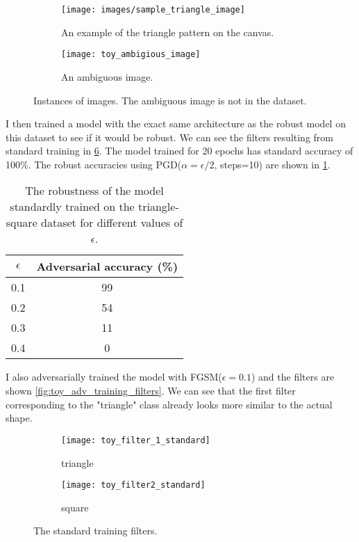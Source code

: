 \documentclass[../thesis.tex]{subfiles}
\begin{document}
	\begin{figure}
		\centering
		\begin{subfigure}{.5\textwidth}
			\centering
			\texttt{[image: images/sample\_triangle\_image]}
			\caption{An example of the triangle pattern on the canvas.}
			\label{fig:sampletriangleimage}
		\end{subfigure}%
		\begin{subfigure}{.5\textwidth}
			\centering
			\texttt{[image: toy\_ambigious\_image]}
			\caption{An ambiguous image.}
			\label{fig:toyambigiousimage}
		\end{subfigure}
		\caption{Instances of images. The ambiguous image is not in the dataset.}
		\label{fig:Triangle_square_image_samples}
	\end{figure}


	I then trained a model with the exact same architecture as the robust model on this dataset to see if it would be robust. We can see the filters resulting from standard training in \ref{fig:toy_standard_training_filters}. The model trained for 20 epochs has standard accuracy of 100\%. The robust accuracies using PGD($\alpha = \epsilon/2$, steps=10) are shown in \ref{tbl:std_model_trig_sqr}. 
	\begin{table}[h!]
		\centering
		\begin{tabular}{|c|c|}
			\hline
			$\epsilon$ & Adversarial accuracy (\%) \\
			\hline
			0.1     & 99                        \\
			\hline
			0.2     & 54                        \\
			\hline
			0.3     & 11                        \\
			\hline
			0.4     & 0                         \\
			\hline
		\end{tabular}
		\caption{The robustness of the model standardly trained on the triangle-square dataset for different values of $\epsilon$.}
		\label{tbl:std_model_trig_sqr}
	\end{table}
	
	I also adversarially trained the model with FGSM($\epsilon=0.1$) and the filters are shown \ref{fig:toy_adv_training_filters}. We can see that the first filter corresponding to the "triangle" class already looks more similar to the actual shape. 
	
	
	\begin{figure}[h!]
		\centering
		\begin{subfigure}{.5\textwidth}
			\centering
			\texttt{[image: toy\_filter\_1\_standard]}
			\caption{triangle}
			\label{fig:toyfilter1standard}
		\end{subfigure}%
		\begin{subfigure}{.5\textwidth}
			\centering
			\texttt{[image: toy\_filter2\_standard]}
			\caption{square}
			\label{fig:toyfilter2standard}
		\end{subfigure}
		\caption{The standard training filters.}
		\label{fig:toy_standard_training_filters}
	\end{figure}
\end{document}
